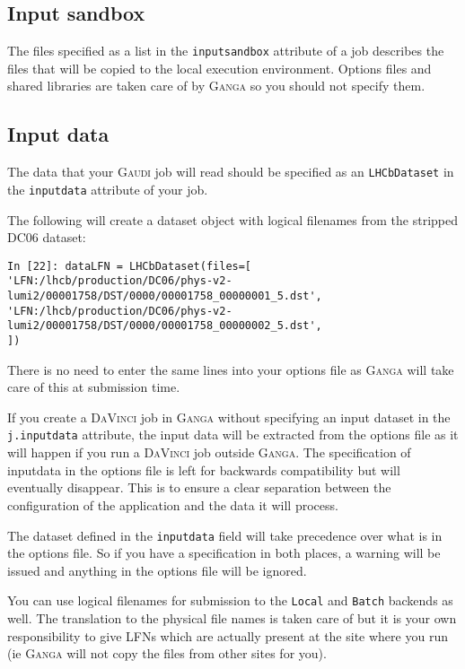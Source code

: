\documentclass{howto}
\def\ganga {\textsc{Ganga}\xspace}
\def\gaudi {\textsc{Gaudi}\xspace}
\def\davinci {\textsc{DaVinci}\xspace}
\begin{document}
\subsection{Input sandbox}
\label{sec:Inputsandbox}
The files specified as a list in the \texttt{inputsandbox} attribute of a job
describes the files that will be copied to the local execution environment.
Options files and shared libraries are taken care of by \ganga so you should
not specify them.

\subsection{Input data}
\label{sec:datasets}
The data that your \gaudi job will read should be specified as an
\texttt{LHCbDataset} in the \texttt{inputdata} attribute of your job.

The following will create a dataset object with logical filenames from the
stripped DC06 dataset:
\begin{verbatim}
In [22]: dataLFN = LHCbDataset(files=[
'LFN:/lhcb/production/DC06/phys-v2-lumi2/00001758/DST/0000/00001758_00000001_5.dst',
'LFN:/lhcb/production/DC06/phys-v2-lumi2/00001758/DST/0000/00001758_00000002_5.dst',
])
\end{verbatim}
There is no need to enter the same lines into your options file as \ganga will
take care of this at submission time.

If you create a \davinci job in \ganga without specifying an input dataset in
the \texttt{j.inputdata} attribute, the input data will be extracted from the
options file as it will happen if you run a \davinci job outside \ganga. The
specification of inputdata in the options file is left for backwards
compatibility but will eventually disappear. This is to ensure a clear
separation between the configuration of the application and the data it will
process.

\begin{notice}
  The dataset defined in the \texttt{inputdata} field will take precedence
  over what is in the options file. So if you have a specification in both
  places, a warning will be issued and anything in the options file will be
  ignored.
\end{notice}

You can use logical filenames for submission to the \texttt{Local} and
\texttt{Batch} backends as well. The translation to the physical file names is
taken care of but it is your own responsibility to give LFNs which are
actually present at the site where you run (ie \ganga will not copy the files
from other sites for you).
\end{document}
